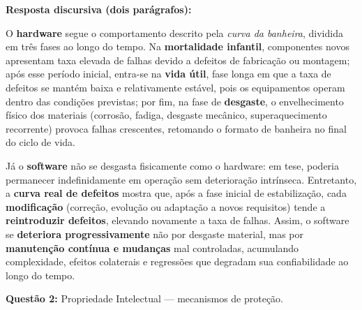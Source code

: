 \documentclass[12pt,a4paper]{article}
\begin{document}
\begin{tcolorbox}[respostabox]
\textbf{Resposta discursiva (dois parágrafos):}

O \textbf{hardware} segue o comportamento descrito pela \textit{curva da banheira}, dividida em três fases ao longo do tempo. Na \textbf{mortalidade infantil}, componentes novos apresentam taxa elevada de falhas devido a defeitos de fabricação ou montagem; após esse período inicial, entra-se na \textbf{vida útil}, fase longa em que a taxa de defeitos se mantém baixa e relativamente estável, pois os equipamentos operam dentro das condições previstas; por fim, na fase de \textbf{desgaste}, o envelhecimento físico dos materiais (corrosão, fadiga, desgaste mecânico, superaquecimento recorrente) provoca falhas crescentes, retomando o formato de banheira no final do ciclo de vida.

Já o \textbf{software} não se desgasta fisicamente como o hardware: em tese, poderia permanecer indefinidamente em operação sem deterioração intrínseca. Entretanto, a \textbf{curva real de defeitos} mostra que, após a fase inicial de estabilização, cada \textbf{modificação} (correção, evolução ou adaptação a novos requisitos) tende a \textbf{reintroduzir defeitos}, elevando novamente a taxa de falhas. Assim, o software se \textbf{deteriora progressivamente} não por desgaste material, mas por \textbf{manutenção contínua e mudanças} mal controladas, acumulando complexidade, efeitos colaterais e regressões que degradam sua confiabilidade ao longo do tempo.
\end{tcolorbox}

\vspace{0.6cm}

\textbf{Questão 2:} Propriedade Intelectual — mecanismos de proteção.
\end{document}
